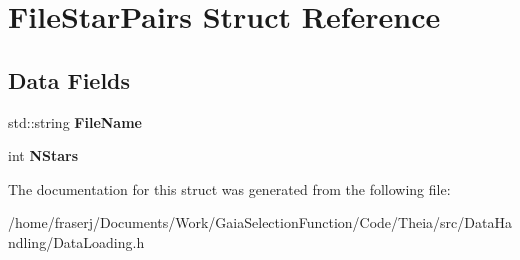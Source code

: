 \hypertarget{structFileStarPairs}{}\section{File\+Star\+Pairs Struct Reference}
\label{structFileStarPairs}
\subsection*{Data Fields}
\begin{DoxyCompactItemize}
\item 
\mbox{\label{structFileStarPairs_aec9230582e62f0acf8838794aea7e490}} 
std\+::string {\bfseries File\+Name}
\item 
\mbox{\label{structFileStarPairs_a2c8e51cf299f1dbbf2e9d73614aee650}} 
int {\bfseries N\+Stars}
\end{DoxyCompactItemize}


The documentation for this struct was generated from the following file\+:\begin{DoxyCompactItemize}
\item 
/home/fraserj/\+Documents/\+Work/\+Gaia\+Selection\+Function/\+Code/\+Theia/src/\+Data\+Handling/Data\+Loading.\+h\end{DoxyCompactItemize}
